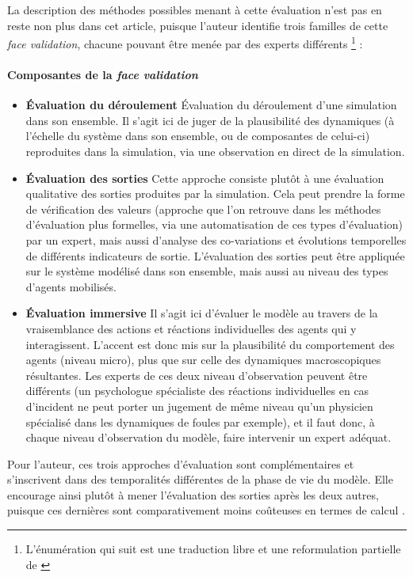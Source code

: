 La description des méthodes possibles menant à cette évaluation n'est pas en reste non plus dans cet article, puisque l'auteur identifie trois familles de cette \textit{face validation}, chacune pouvant être menée par des experts différents \footnote{L'énumération qui suit est une traduction libre et une reformulation partielle de \cite[41-42]{klugl_validation_2008}} :
\paragraph*{Composantes de la \textit{face validation}}\label{par:composantes-face-validation}
\begin{itemize}
	\item \textbf{Évaluation du déroulement} Évaluation du déroulement d'une simulation dans son ensemble.
	Il s'agit ici de juger de la plausibilité des dynamiques (à l'échelle du système dans son ensemble, ou de composantes de celui-ci) reproduites dans la simulation, via une observation en direct de la simulation.
	
	\item \textbf{Évaluation des sorties} Cette approche consiste plutôt à une évaluation qualitative des sorties produites par la simulation.
	Cela peut prendre la forme de vérification des valeurs (approche que l'on retrouve dans les méthodes d'évaluation plus formelles, via une automatisation de ces types d'évaluation) par un expert, mais aussi d'analyse des co-variations et évolutions temporelles de différents indicateurs de sortie.
	L'évaluation des sorties peut être appliquée sur le système modélisé dans son ensemble, mais aussi au niveau des types d'agents mobilisés.
	
	\item \textbf{Évaluation \og immersive\fg{}} Il s'agit ici d'évaluer le modèle au travers de la vraisemblance des actions et réactions individuelles des agents qui y interagissent. L'accent est donc mis sur la plausibilité du comportement des agents (niveau micro), plus que sur celle des dynamiques macroscopiques résultantes.
	Les experts de ces deux niveau d'observation peuvent être différents (un psychologue spécialiste des réactions individuelles en cas d'incident ne peut porter un jugement de même niveau qu'un physicien spécialisé dans les dynamiques de foules par exemple), et il faut donc, à chaque niveau d'observation du modèle, faire intervenir un expert adéquat.
\end{itemize}


Pour l'auteur, ces trois approches d'évaluation sont complémentaires et s'inscrivent dans des temporalités différentes de la phase de vie du modèle. Elle encourage ainsi plutôt à mener l'évaluation des sorties après les deux autres, puisque ces dernières sont comparativement moins coûteuses en termes de calcul \autocite[42]{klugl_validation_2008}.

